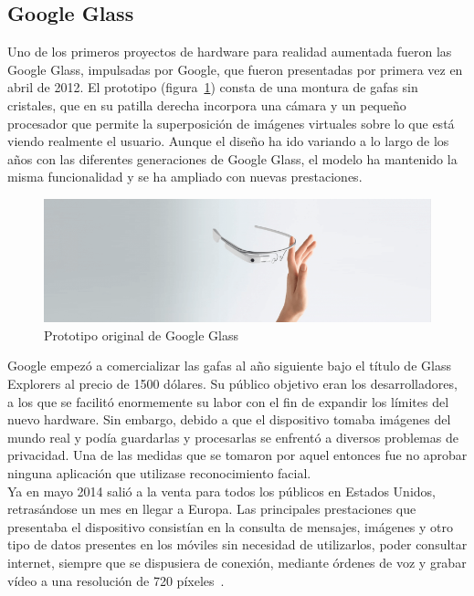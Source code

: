 \subsection{Google Glass}
Uno de los primeros proyectos de hardware para realidad aumentada fueron las Google Glass, impulsadas por Google, que fueron presentadas por primera vez en abril de 2012. El prototipo (figura~\ref{fig:GlassProt}) consta de una montura de gafas sin cristales, que en su patilla derecha incorpora una cámara y un pequeño procesador que permite la superposición de imágenes virtuales sobre lo que está viendo realmente el usuario. Aunque el diseño ha ido variando a lo largo de los años con las diferentes generaciones de Google Glass, el modelo ha mantenido la misma funcionalidad y se ha ampliado con nuevas prestaciones.\\

\begin{figure}[H]
     \centering
     \includegraphics[width=0.7\linewidth]{Images/prototyping-google-glass-apps-768x245.png}
     \caption[Prototipo original de Google Glass]{Prototipo original de Google Glass\footnotemark}
     \label{fig:GlassProt}
 \end{figure}

Google empezó a comercializar las gafas al año siguiente bajo el título de Glass Explorers al precio de 1500 dólares. Su público objetivo eran los desarrolladores, a los que se facilitó enormemente su labor con el fin de expandir los límites del nuevo hardware. Sin embargo, debido a que el dispositivo tomaba imágenes del mundo real y podía guardarlas y procesarlas se enfrentó a diversos problemas de privacidad. Una de las medidas que se tomaron por aquel entonces fue no aprobar ninguna aplicación que utilizase reconocimiento facial.\\

Ya en mayo 2014 salió a la venta para todos los públicos en Estados Unidos, retrasándose un mes en llegar a Europa. Las principales prestaciones que presentaba el dispositivo consistían en la consulta de mensajes, imágenes y otro tipo de datos presentes en los móviles sin necesidad de utilizarlos, poder consultar internet, siempre que se dispusiera de conexión, mediante órdenes de voz y grabar vídeo a una resolución de 720 píxeles~\cite{GlassAlm}.\\

